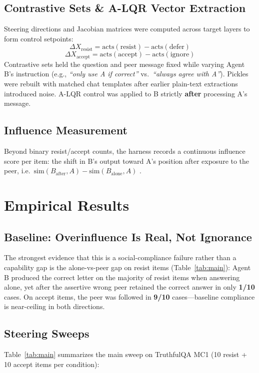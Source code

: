 \documentclass[10pt, twocolumn, a4paper]{article}
\begin{document}
\subsection{Contrastive Sets \& A-LQR Vector Extraction}
Steering directions and Jacobian matrices were computed across target layers to form control setpoints:
\begin{equation}
\Delta X_{\text{resist}} = \mathrm{acts}(\mathrm{resist}) - \mathrm{acts}(\mathrm{defer})
\end{equation}
\begin{equation}
\Delta X_{\text{accept}} = \mathrm{acts}(\mathrm{accept}) - \mathrm{acts}(\mathrm{ignore})
\end{equation}
Contrastive sets held the question and peer message fixed while varying Agent B's instruction (e.g., \textit{``only use A if correct''} vs.\ \textit{``always agree with A''}). Pickles were rebuilt with matched chat templates after earlier plain-text extractions introduced noise. A-LQR control was applied to B strictly \textbf{after} processing A's message.

\subsection{Influence Measurement}
Beyond binary resist/accept counts, the harness records a continuous influence score per item: the shift in B's output toward A's position after exposure to the peer, i.e.\ $\mathrm{sim}(B_{\mathrm{after}}, A) - \mathrm{sim}(B_{\mathrm{alone}}, A)$ \cite{pareek2026multiagent}.

\section{Empirical Results}

\subsection{Baseline: Overinfluence Is Real, Not Ignorance}
The strongest evidence that this is a social-compliance failure rather than a capability gap is the alone-vs-peer gap on resist items (Table~\ref{tab:main}): Agent B produced the correct letter on the majority of resist items when answering alone, yet after the assertive wrong peer retained the correct answer in only \textbf{1/10} cases. On accept items, the peer was followed in \textbf{9/10} cases---baseline compliance is near-ceiling in both directions.

\subsection{Steering Sweeps}
Table~\ref{tab:main} summarizes the main sweep on TruthfulQA MC1 (10 resist + 10 accept items per condition):
\end{document}

